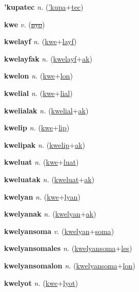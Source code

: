\textbf{\hypertarget{'kupatec}{'kupatec}} \textit{n.} (\hyperlink{'kupa}{'kupa}+\allowbreak \hyperlink{tec}{tec})


\textbf{\hypertarget{kwe}{kwe}} \textit{v.} (\hyperlink{nyo}{\sout{nyo}})


\textbf{\hypertarget{kwelayf}{kwelayf}} \textit{n.} (\hyperlink{kwe}{kwe}+\allowbreak \hyperlink{layf}{layf})


\textbf{\hypertarget{kwelayfak}{kwelayfak}} \textit{n.} (\hyperlink{kwelayf}{kwelayf}+\allowbreak \hyperlink{ak}{ak})


\textbf{\hypertarget{kwelon}{kwelon}} \textit{n.} (\hyperlink{kwe}{kwe}+\allowbreak \hyperlink{lon}{lon})


\textbf{\hypertarget{kwelial}{kwelial}} \textit{n.} (\hyperlink{kwe}{kwe}+\allowbreak \hyperlink{lial}{lial})


\textbf{\hypertarget{kwelialak}{kwelialak}} \textit{n.} (\hyperlink{kwelial}{kwelial}+\allowbreak \hyperlink{ak}{ak})


\textbf{\hypertarget{kwelip}{kwelip}} \textit{n.} (\hyperlink{kwe}{kwe}+\allowbreak \hyperlink{lip}{lip})


\textbf{\hypertarget{kwelipak}{kwelipak}} \textit{n.} (\hyperlink{kwelip}{kwelip}+\allowbreak \hyperlink{ak}{ak})


\textbf{\hypertarget{kweluat}{kweluat}} \textit{n.} (\hyperlink{kwe}{kwe}+\allowbreak \hyperlink{luat}{luat})


\textbf{\hypertarget{kweluatak}{kweluatak}} \textit{n.} (\hyperlink{kweluat}{kweluat}+\allowbreak \hyperlink{ak}{ak})


\textbf{\hypertarget{kwelyan}{kwelyan}} \textit{n.} (\hyperlink{kwe}{kwe}+\allowbreak \hyperlink{lyan}{lyan})


\textbf{\hypertarget{kwelyanak}{kwelyanak}} \textit{n.} (\hyperlink{kwelyan}{kwelyan}+\allowbreak \hyperlink{ak}{ak})


\textbf{\hypertarget{kwelyansoma}{kwelyansoma}} \textit{v.} (\hyperlink{kwelyan}{kwelyan}+\allowbreak \hyperlink{soma}{soma})


\textbf{\hypertarget{kwelyansomales}{kwelyansomales}} \textit{n.} (\hyperlink{kwelyansoma}{kwelyansoma}+\allowbreak \hyperlink{les}{les})


\textbf{\hypertarget{kwelyansomalon}{kwelyansomalon}} \textit{n.} (\hyperlink{kwelyansoma}{kwelyansoma}+\allowbreak \hyperlink{lon}{lon})


\textbf{\hypertarget{kwelyot}{kwelyot}} \textit{n.} (\hyperlink{kwe}{kwe}+\allowbreak \hyperlink{lyot}{lyot})


